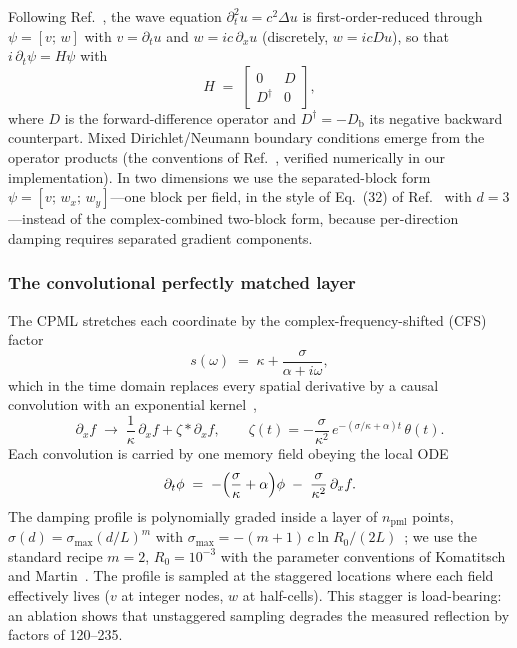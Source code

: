 Following Ref.~\cite{sato2024hamiltonian}, the wave equation
$\partial_t^2 u = c^2\Delta u$ is first-order-reduced through
$\psi = [v;\,w]$ with $v=\partial_t u$ and $w = i c\,\partial_x u$
(discretely, $w = icDu$), so that $i\,\partial_t\psi = H\psi$ with
\begin{equation}
  H \;=\; \begin{bmatrix} 0 & D \\ D^{\dagger} & 0 \end{bmatrix},
  \label{ch3:eq:waveH}
\end{equation}
where $D$ is the forward-difference operator and
$D^{\dagger}=-D_{\mathrm{b}}$ its negative backward counterpart.  Mixed
Dirichlet/Neumann boundary conditions emerge from the operator products
(the conventions of Ref.~\cite{sato2024hamiltonian}, verified numerically
in our implementation).  In two dimensions we use the separated-block form
$\psi = [v;\,w_x;\,w_y]$---one block per field, in the style of Eq.~(32)
of Ref.~\cite{sato2024hamiltonian} with $d=3$---instead of the
complex-combined two-block form, because per-direction damping requires
separated gradient components.

\subsubsection{The convolutional perfectly matched layer}
\label{ch3:sec:cpml}

The CPML stretches each coordinate by the complex-frequency-shifted (CFS)
factor
\begin{equation}
  s(\omega) \;=\; \kappa + \frac{\sigma}{\alpha + i\omega},
  \label{ch3:eq:cfs}
\end{equation}
which in the time domain replaces every spatial derivative by a causal
convolution with an exponential kernel~\cite{roden2000cpml},
\begin{equation}
  \partial_x f \;\longrightarrow\; \frac{1}{\kappa}\,\partial_x f
    + \zeta * \partial_x f, \qquad
  \zeta(t) = -\frac{\sigma}{\kappa^{2}}\,
    e^{-(\sigma/\kappa+\alpha)t}\,\theta(t).
  \label{ch3:eq:kernel}
\end{equation}
Each convolution is carried by one memory field obeying the local ODE
\begin{equation}
  \partial_t \phi \;=\; -\Bigl(\frac{\sigma}{\kappa}+\alpha\Bigr)\phi
    \;-\; \frac{\sigma}{\kappa^{2}}\,\partial_x f .
  \label{ch3:eq:memoryode}
\end{equation}
The damping profile is polynomially graded inside a layer of
$n_{\mathrm{pml}}$ points, $\sigma(d) = \sigma_{\max}(d/L)^{m}$ with
$\sigma_{\max} = -(m{+}1)\,c\ln R_0/(2L)$~\cite{collino2001pml}; we use
the standard recipe $m=2$, $R_0=10^{-3}$ with the parameter conventions of
Komatitsch and Martin~\cite{komatitsch2007unsplit}.  The profile is
sampled at the staggered locations where each field effectively lives
($v$ at integer nodes, $w$ at half-cells).  This stagger is load-bearing:
an ablation shows that unstaggered sampling degrades the measured
reflection by factors of 120--235.

